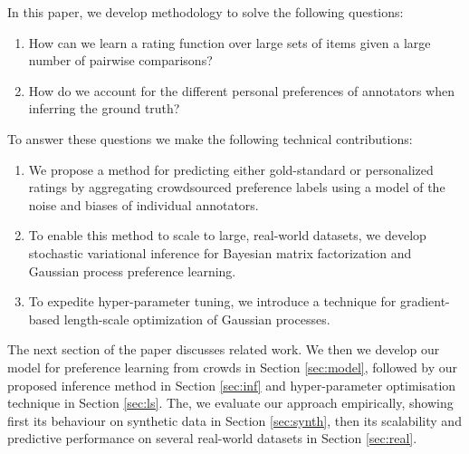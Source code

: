 In this paper, we develop methodology to solve the following questions:
\begin{enumerate}
  \item How can we learn a rating function over large sets of items given a large number of pairwise comparisons?
  \item How do we account for the different personal preferences of annotators when inferring the ground truth?
\end{enumerate}
To answer these questions we make the following technical contributions:
\begin{enumerate}
 \item We propose a method for predicting either gold-standard or personalized ratings by aggregating crowdsourced preference labels using a model of the noise and biases of individual annotators. %
  \item %
   To enable this method to scale to large, real-world datasets, we develop
   stochastic variational inference for Bayesian matrix factorization and Gaussian process preference learning.
  \item To expedite hyper-parameter tuning, we introduce a technique for gradient-based length-scale optimization of Gaussian processes.
\end{enumerate}

The next section of the paper discusses related work.
We then we develop our model for preference learning from crowds in Section \ref{sec:model},
followed by our proposed inference method in Section \ref{sec:inf} and
hyper-parameter optimisation technique in Section \ref{sec:ls}.
The, we evaluate our approach empirically, showing first its behaviour on synthetic data in Section
\ref{sec:synth}, then its scalability and predictive performance on several real-world datasets 
in Section \ref{sec:real}.

